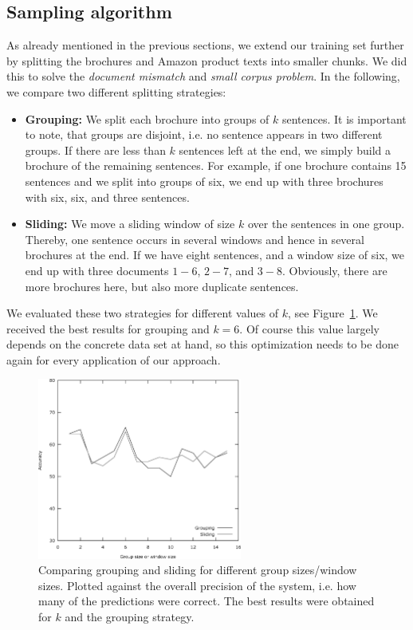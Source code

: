 \subsection{Sampling algorithm}
As already mentioned in the previous sections, we extend our training set further by splitting the brochures and Amazon product texts into smaller chunks.
We did this to solve the \emph{document mismatch} and \emph{small corpus problem}.
In the following, we compare two different splitting strategies:
\begin{itemize}
	\item
		\textbf{Grouping:}
		We split each brochure into groups of $k$ sentences.
		It is important to note, that groups are disjoint, i.e. no sentence appears in two different groups.
		If there are less than $k$ sentences left at the end, we simply build a brochure of the remaining sentences.
		For example, if one brochure contains 15 sentences and we split into groups of six, we end up with three brochures with six, six, and three sentences.
	\item
		\textbf{Sliding:}
		We move a sliding window of size $k$ over the sentences in one group.
		Thereby, one sentence occurs in several windows and hence in several brochures at the end.
		If we have eight sentences, and a window size of six, we end up with three documents $1 - 6$, $2 - 7$, and $3 - 8$.
		Obviously, there are more brochures here, but also more duplicate sentences.
\end{itemize}

We evaluated these two strategies for different values of $k$, see Figure~\ref{fig:sampling_optimization}.
We received the best results for grouping and $k = 6$.
Of course this value largely depends on the concrete data set at hand, so this optimization needs to be done again for every application of our \nto approach.

\begin{figure}
	\label{fig:sampling_optimization}
	\begin{center}
		\includegraphics[width=0.6\textwidth]{figures/sampling_optimization.eps}
	\end{center}
	\caption{Comparing grouping and sliding for different group sizes/window sizes. Plotted against the overall precision of the system, i.e. how many of the predictions were correct. The best results were obtained for $k$ and the grouping strategy.}
\end{figure}
